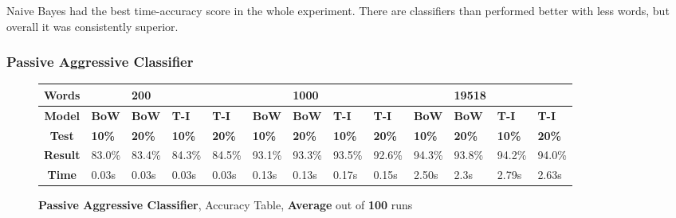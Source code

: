 \documentclass{article}
\begin{document}
	\par Naive Bayes had the best time-accuracy score in the whole experiment. There are classifiers than performed better with less words, but overall it was consistently superior.
    
	\subsubsection{Passive Aggressive Classifier}
	\begin{figure}[H]
		\begin{tabular}{||c||l|l|l|l||l|l|l|l||l|l|l|l||}
			\hline
			\textbf{Words} &  & \textbf{200} & & & &\textbf{1000} & & & & \textbf{19518} &  & \\ \hline 
			\textbf{Model} & \textbf{BoW} & \textbf{BoW} & \textbf{T-I} & \textbf{T-I} &\textbf{BoW} & \textbf{BoW} & \textbf{T-I} & \textbf{T-I} & \textbf{BoW} & \textbf{BoW} & \textbf{T-I} & \textbf{T-I}\\ \hline
			\textbf{Test} & \textbf{10\%} & \textbf{20\%} & \textbf{10\%} & \textbf{20\%} & \textbf{10\%} & \textbf{20\%} & \textbf{10\%} & \textbf{20\%} & \textbf{10\%} & \textbf{20\%} & \textbf{10\%} & \textbf{20\%} \\ \hline \hline  
			\textbf{Result} & 83.0\% & 83.4\% & 84.3\% & 84.5\% & 93.1\% & 93.3\% & 93.5\% & 92.6\% & 94.3\% & 93.8\% & 94.2\% & 94.0\% \\ \hline 
			\textbf{Time} & 0.03s & 0.03s & 0.03s & 0.03s & 0.13s & 0.13s & 0.17s & 0.15s & 2.50s & 2.3s & 2.79s & 2.63s \\ \hline 
		\end{tabular}
		\caption{\textbf{Passive Aggressive Classifier}, Accuracy Table, \textbf{Average} out of \textbf{100} runs}
	\end{figure}    
    
\end{document}

